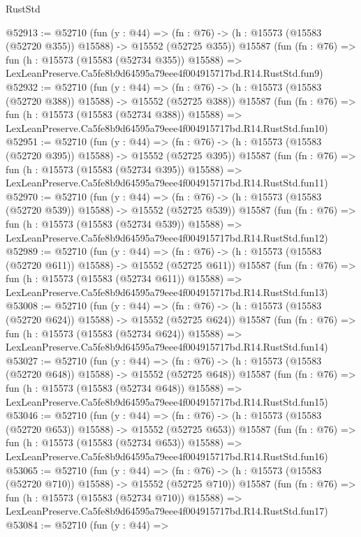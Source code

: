 \begin{lexlean}{RustStd}
\begin{coremodule}
@52913 := @52710
    (fun (y : @44) =>
    (fn : @76) -> (h : @15573 (@15583 (@52720 @355)) @15588) -> @15552 (@52725 @355))
    @15587
    (fun (fn : @76) =>
    fun (h : @15573 (@15583 (@52734 @355)) @15588) =>
    LexLeanPreserve.Ca5fe8b9d64595a79eee4f004915717bd.R14.RustStd.fun9)
@52932 := @52710
    (fun (y : @44) =>
    (fn : @76) -> (h : @15573 (@15583 (@52720 @388)) @15588) -> @15552 (@52725 @388))
    @15587
    (fun (fn : @76) =>
    fun (h : @15573 (@15583 (@52734 @388)) @15588) =>
    LexLeanPreserve.Ca5fe8b9d64595a79eee4f004915717bd.R14.RustStd.fun10)
@52951 := @52710
    (fun (y : @44) =>
    (fn : @76) -> (h : @15573 (@15583 (@52720 @395)) @15588) -> @15552 (@52725 @395))
    @15587
    (fun (fn : @76) =>
    fun (h : @15573 (@15583 (@52734 @395)) @15588) =>
    LexLeanPreserve.Ca5fe8b9d64595a79eee4f004915717bd.R14.RustStd.fun11)
@52970 := @52710
    (fun (y : @44) =>
    (fn : @76) -> (h : @15573 (@15583 (@52720 @539)) @15588) -> @15552 (@52725 @539))
    @15587
    (fun (fn : @76) =>
    fun (h : @15573 (@15583 (@52734 @539)) @15588) =>
    LexLeanPreserve.Ca5fe8b9d64595a79eee4f004915717bd.R14.RustStd.fun12)
@52989 := @52710
    (fun (y : @44) =>
    (fn : @76) -> (h : @15573 (@15583 (@52720 @611)) @15588) -> @15552 (@52725 @611))
    @15587
    (fun (fn : @76) =>
    fun (h : @15573 (@15583 (@52734 @611)) @15588) =>
    LexLeanPreserve.Ca5fe8b9d64595a79eee4f004915717bd.R14.RustStd.fun13)
@53008 := @52710
    (fun (y : @44) =>
    (fn : @76) -> (h : @15573 (@15583 (@52720 @624)) @15588) -> @15552 (@52725 @624))
    @15587
    (fun (fn : @76) =>
    fun (h : @15573 (@15583 (@52734 @624)) @15588) =>
    LexLeanPreserve.Ca5fe8b9d64595a79eee4f004915717bd.R14.RustStd.fun14)
@53027 := @52710
    (fun (y : @44) =>
    (fn : @76) -> (h : @15573 (@15583 (@52720 @648)) @15588) -> @15552 (@52725 @648))
    @15587
    (fun (fn : @76) =>
    fun (h : @15573 (@15583 (@52734 @648)) @15588) =>
    LexLeanPreserve.Ca5fe8b9d64595a79eee4f004915717bd.R14.RustStd.fun15)
@53046 := @52710
    (fun (y : @44) =>
    (fn : @76) -> (h : @15573 (@15583 (@52720 @653)) @15588) -> @15552 (@52725 @653))
    @15587
    (fun (fn : @76) =>
    fun (h : @15573 (@15583 (@52734 @653)) @15588) =>
    LexLeanPreserve.Ca5fe8b9d64595a79eee4f004915717bd.R14.RustStd.fun16)
@53065 := @52710
    (fun (y : @44) =>
    (fn : @76) -> (h : @15573 (@15583 (@52720 @710)) @15588) -> @15552 (@52725 @710))
    @15587
    (fun (fn : @76) =>
    fun (h : @15573 (@15583 (@52734 @710)) @15588) =>
    LexLeanPreserve.Ca5fe8b9d64595a79eee4f004915717bd.R14.RustStd.fun17)
@53084 := @52710
    (fun (y : @44) =>

\end{coremodule}
\end{lexlean}
